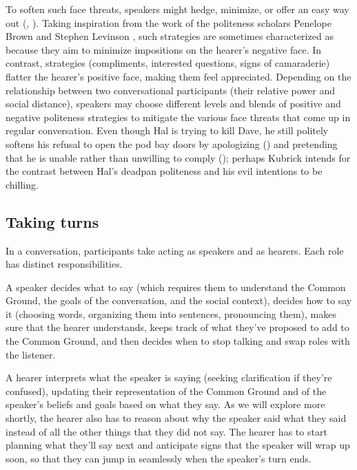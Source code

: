  To soften such face threats, speakers might hedge, minimize, or offer an easy way out (, ).  
Taking inspiration from the work of the politeness scholars Penelope Brown and Stephen Levinson \citep{BrownLevinson:1987}, such strategies are sometimes characterized as  because they aim to minimize impositions on the hearer's negative face.  In contrast,  strategies (compliments, interested questions, signs of camaraderie)  flatter the hearer's positive face, making them feel appreciated.  Depending on the relationship between two conversational participants (their relative power and social distance), speakers may choose different levels and blends of positive and negative politeness strategies to mitigate the various face threats that come up in regular conversation.  Even though Hal is trying to kill Dave, he still politely softens his refusal to open the pod bay doors by apologizing () and pretending that he is unable rather than unwilling to comply (); perhaps Kubrick intends for the contrast between Hal's deadpan politeness and his evil intentions to be chilling.


\subsection{Taking turns}

In a conversation, participants take  acting as speakers and as hearers.  Each role has distinct responsibilities.

A speaker decides what to say (which requires them to understand the Common Ground, the goals of the conversation, and the social context),  decides how to say it (choosing words, organizing them into sentences, pronouncing them), makes sure that the hearer understands, keeps track of what they've  proposed to add to the Common Ground, and then decides when to stop talking and swap roles with the listener.

A hearer interprets what the speaker is saying (seeking clarification if they're confused), updating their representation of the Common Ground and of the speaker's beliefs and goals based on what they say.  As we will explore more shortly, the hearer also has to reason about why the speaker said what they said instead of all the other things that they did not say.  The hearer  has to start planning what they'll say next and anticipate signs that the speaker will wrap up soon, so that they can jump in seamlessly when the speaker's turn ends.

